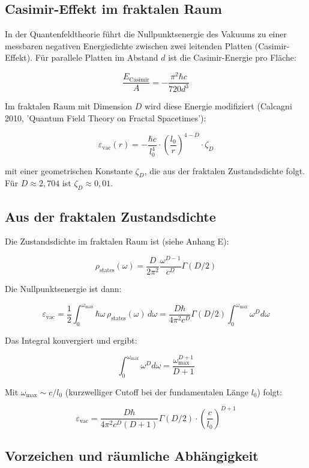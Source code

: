 \subsection{Casimir-Effekt im fraktalen Raum}

In der Quantenfeldtheorie führt die Nullpunktsenergie des Vakuums zu einer messbaren 
negativen Energiedichte zwischen zwei leitenden Platten (Casimir-Effekt). 
Für parallele Platten im Abstand \( d \) ist die Casimir-Energie pro Fläche:

\[
\frac{E_{\text{Casimir}}}{A} = -\frac{\pi^2 \hbar c}{720 d^3}
\]

Im fraktalen Raum mit Dimension \( D \) wird diese Energie modifiziert 
(Calcagni 2010, 'Quantum Field Theory on Fractal Spacetimes'):

\[
\varepsilon_{\text{vac}}(r) = -\frac{\hbar c}{l_0^4} \cdot \left( \frac{l_0}{r} \right)^{4-D} \cdot \zeta_D \tag{J.3}
\]

mit einer geometrischen Konstante \( \zeta_D \), die aus der fraktalen Zustandsdichte folgt. 
Für \( D \approx 2,704 \) ist \( \zeta_D \approx 0,01 \).

\subsection{Aus der fraktalen Zustandsdichte}

Die Zustandsdichte im fraktalen Raum ist (siehe Anhang E):

\[
\rho_{\text{states}}(\omega) = \frac{D}{2\pi^2} \frac{\omega^{D-1}}{c^D} \Gamma(D/2) \tag{J.4}
\]

Die Nullpunktsenergie ist dann:

\[
\varepsilon_{\text{vac}} = \frac{1}{2} \int_0^{\omega_{\text{max}}} \hbar \omega \, 
\rho_{\text{states}}(\omega) \, d\omega 
= \frac{D \hbar}{4\pi^2 c^D} \Gamma(D/2) \int_0^{\omega_{\text{max}}} \omega^D d\omega
\]

Das Integral konvergiert und ergibt:

\[
\int_0^{\omega_{\text{max}}} \omega^D d\omega = \frac{\omega_{\text{max}}^{D+1}}{D+1}
\]

Mit \( \omega_{\text{max}} \sim c/l_0 \) (kurzwelliger Cutoff bei der fundamentalen Länge \( l_0 \)) 
folgt:

\[
\varepsilon_{\text{vac}} = \frac{D \hbar}{4\pi^2 c^D (D+1)} \Gamma(D/2) \cdot 
\left( \frac{c}{l_0} \right)^{D+1} \tag{J.5}
\]

\subsection{Vorzeichen und räumliche Abhängigkeit}


